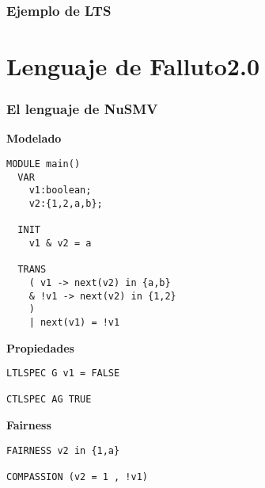 \documentclass[serif]{beamer}
\begin{document}
\begin{frame}
\frametitle{Ejemplo de LTS}
\end{frame}




\section{Lenguaje de Falluto2.0}


\begin{frame}[fragile]
\frametitle{El lenguaje de NuSMV}

{\fontsize{8pt}{10pt}\selectfont
\begin{minipage}{0.5\textwidth}
{\large \bfseries Modelado}
\begin{framed} \begin{verbatim}
MODULE main()
  VAR
    v1:boolean;
    v2:{1,2,a,b};

  INIT
    v1 & v2 = a

  TRANS
    ( v1 -> next(v2) in {a,b}
    & !v1 -> next(v2) in {1,2}
    ) 
    | next(v1) = !v1
\end{verbatim}
\end{framed}
\end{minipage}
\hspace{0.04\textwidth}
\begin{minipage}{0.44\textwidth}
{\large \bfseries Propiedades}
\begin{framed}
\begin{verbatim}
LTLSPEC G v1 = FALSE

CTLSPEC AG TRUE
\end{verbatim}
\end{framed}
{\large \bfseries Fairness}
\begin{framed}
\begin{verbatim}
FAIRNESS v2 in {1,a}

COMPASSION (v2 = 1 , !v1)
\end{verbatim}
\end{framed}
\end{minipage}
} %
\end{frame}
\end{document}
